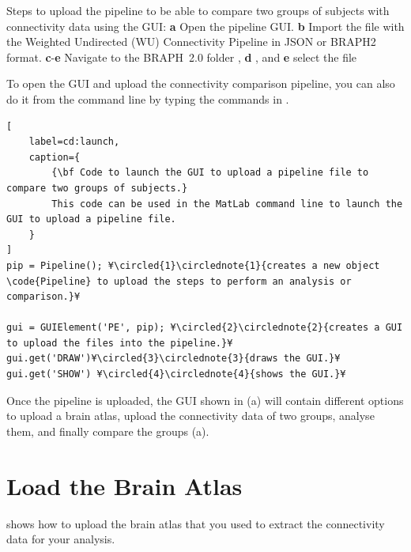 \documentclass[justified]{tufte-handout}
\begin{document}
	{
	Steps to upload the pipeline to be able to compare two groups of subjects with connectivity data using the GUI: 
	{\bf a} Open the pipeline GUI.
	{\bf b} Import the file with the Weighted Undirected (WU) Connectivity Pipeline in JSON or BRAPH2 format.
	{\bf c}-{\bf e} Navigate to the BRAPH~2.0 folder , {\bf d} , and {\bf e} select the file  

To open the GUI and upload the connectivity comparison pipeline, you can also do it from the command line by typing the commands in .
%
\begin{lstlisting}[
	label=cd:launch,
	caption={
		{\bf Code to launch the GUI to upload a pipeline file to compare two groups of subjects.}
		This code can be used in the MatLab command line to launch the GUI to upload a pipeline file.
	}
]
pip = Pipeline(); ¥\circled{1}\circlednote{1}{creates a new object \code{Pipeline} to upload the steps to perform an analysis or comparison.}¥

gui = GUIElement('PE', pip); ¥\circled{2}\circlednote{2}{creates a GUI to upload the files into the pipeline.}¥
gui.get('DRAW')¥\circled{3}\circlednote{3}{draws the GUI.}¥
gui.get('SHOW') ¥\circled{4}\circlednote{4}{shows the GUI.}¥
\end{lstlisting}


Once the pipeline is uploaded, the GUI shown in (a) will contain different options to upload a brain atlas, upload the connectivity data of two groups, analyse them, and finally compare the groups (a). 

\section{Load the Brain Atlas}

 shows how to upload the brain atlas that you used to extract the connectivity data for your analysis.

}
\end{document}
